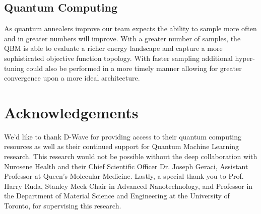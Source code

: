 \documentclass[%
 reprint,
 amsmath,amssymb,
 aps,
]{revtex4-2}
\begin{document}
\subsection{Quantum Computing}
As quantum annealers improve our team expects the ability to sample more often and in greater numbers will improve. With a greater number of samples, the QBM is able to evaluate a richer energy landscape and capture a more sophisticated objective function topology. With faster sampling additional hyper-tuning could also be performed in a more timely manner allowing for greater convergence upon a more ideal architecture.

\section*{Acknowledgements}
We'd like to thank D-Wave for providing access to their quantum computing resources as well as their continued support for Quantum Machine Learning research. This research would not be possible without the deep collaboration with Nurosene Health and their Chief Scientific Officer Dr. Joseph Geraci, Assistant Professor at Queen’s Molecular Medicine. Lastly, a special thank you to Prof. Harry Ruda, Stanley Meek Chair in Advanced Nanotechnology, and Professor in the Department of Material Science and Engineering at the University of Toronto, for supervising this research.

\end{document}
